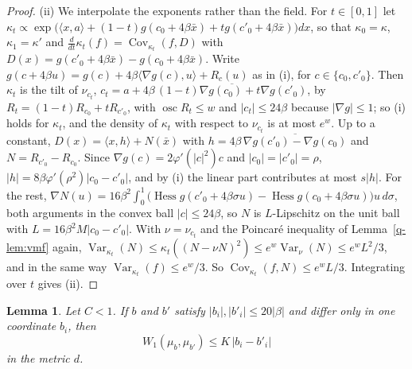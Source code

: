 \documentclass[11pt]{amsart}
\newtheorem{lemma}[theorem]{Lemma}
\theoremstyle{definition}
\theoremstyle{remark}
\numberwithin{equation}{section}
\newcommand{\Hess}{\operatorname{Hess}}
\newcommand{\Cov}{\operatorname{Cov}}
\newcommand{\Var}{\operatorname{Var}}
\newcommand{\ip}[2]{\langle #1,#2\rangle}
\begin{document}
\begin{proof}
(ii) We interpolate the exponents rather than the field. For $t\in[0,1]$
let $\kappa_t\propto\exp\bigl(\ip xa+(1-t)g(c_0+4\beta\bar x)+tg(c'_0+4\beta
\bar x)\bigr)dx$, so that $\kappa_0=\kappa$, $\kappa_1=\kappa'$ and
$\frac d{dt}\kappa_t(f)=\Cov_{\kappa_t}(f,D)$ with $D(x)=g(c'_0+4\beta\bar x)-
g(c_0+4\beta\bar x)$. Write $g(c+4\beta u)=g(c)+4\beta\ip{\nabla g(c)}u+R_c(u)$
as in (i), for $c\in\{c_0,c'_0\}$. Then $\kappa_t$ is the tilt of $\nu_{c_t}$,
$c_t=a+4\beta\,\overline{(1-t)\nabla g(c_0)+t\nabla g(c'_0)}$, by
$R_t=(1-t)R_{c_0}+tR_{c'_0}$, with $\operatorname{osc}R_t\le w$ and $|c_t|\le
24\beta$ because $|\nabla g|\le1$; so (i) holds for $\kappa_t$, and the
density of $\kappa_t$ with respect to $\nu_{c_t}$ is at most $e^w$. Up to a
constant, $D(x)=\ip xh+N(\bar x)$ with $h=4\beta\,\overline{\nabla g(c'_0)-\nabla
g(c_0)}$ and $N=R_{c'_0}-R_{c_0}$. Since $\nabla g(c)=2\varphi'(|c|^2)c$ and
$|c_0|=|c'_0|=\rho$, $|h|=8\beta\varphi'(\rho^2)|c_0-c'_0|$, and by (i) the
linear part contributes at most $s|h|$. For the rest, $\nabla N(u)=16\beta^2
\int_0^1\bigl(\Hess g(c'_0+4\beta\sigma u)-\Hess g(c_0+4\beta\sigma u)\bigr)u\,
d\sigma$, both arguments in the convex ball $|c|\le24\beta$, so $N$ is
$L$-Lipschitz on the unit ball with $L=16\beta^2M|c_0-c'_0|$. With $\nu=
\nu_{c_t}$ and the Poincar\'e inequality of Lemma~\ref{q-lem:vmf} again,
$\Var_{\kappa_t}(N)\le\kappa_t((N-\nu N)^2)\le e^w\Var_\nu(N)\le e^wL^2/3$,
and in the same way $\Var_{\kappa_t}(f)\le e^w/3$. So
$\Cov_{\kappa_t}(f,N)\le e^wL/3$. Integrating over $t$ gives (ii).
\end{proof}

\begin{lemma}\label{lem:blockK}
Let $C<1$. If $b$ and $b'$ satisfy $|b_i|,|b'_i|\le20|\beta|$ and differ
only in one coordinate $b_i$, then
\[
W_1(\mu_b,\mu_{b'})\le K\,|b_i-b'_i|
\]
in the metric $d$.
\end{lemma}
\end{document}
